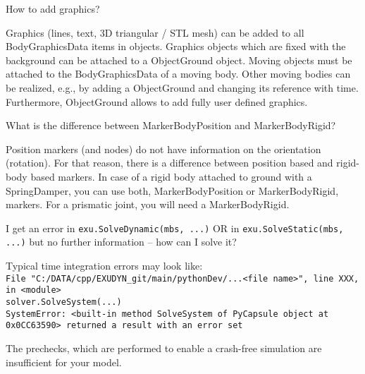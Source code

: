 	\ei
  \item How to add graphics?
	\bi
	\item[$\ra$] Graphics (lines, text, 3D triangular / STL mesh) can be added to all BodyGraphicsData items in objects. Graphics objects which are fixed with the background can be attached to a ObjectGround object.
	Moving objects must be attached to the BodyGraphicsData of a moving body. Other moving bodies can be realized, e.g., by adding a ObjectGround and changing its reference with time. Furthermore, ObjectGround allows to add fully user defined graphics.
	\ei
  \item What is the difference between MarkerBodyPosition and MarkerBodyRigid?
	\bi
	\item[$\ra$] Position markers (and nodes) do not have information on the orientation (rotation). For that reason, there is a difference between position based and rigid-body based markers. In case of a rigid body attached to ground with a SpringDamper, you can use both, MarkerBodyPosition or MarkerBodyRigid, markers. For a prismatic joint, you will need a MarkerBodyRigid.
	\ei
  \item I get an error in \texttt{exu.SolveDynamic(mbs, ...)} OR in \texttt{exu.SolveStatic(mbs, ...)}
	but no further information -- how can I solve it?
	\bi
	\item[$\ra$] Typical time integration errors may look like:\\
	{\footnotesize
  \texttt{File "C:/DATA/cpp/EXUDYN\_git/main/pythonDev/...<file name>", line XXX, in <module>}\\  
	\texttt{solver.SolveSystem(...)}\\
  \texttt{SystemError: <built-in method SolveSystem of PyCapsule object at 0x0CC63590> returned a result with an error set}}
	\item[$\ra$] The prechecks, which are performed to enable a crash-free simulation are insufficient for your model.
